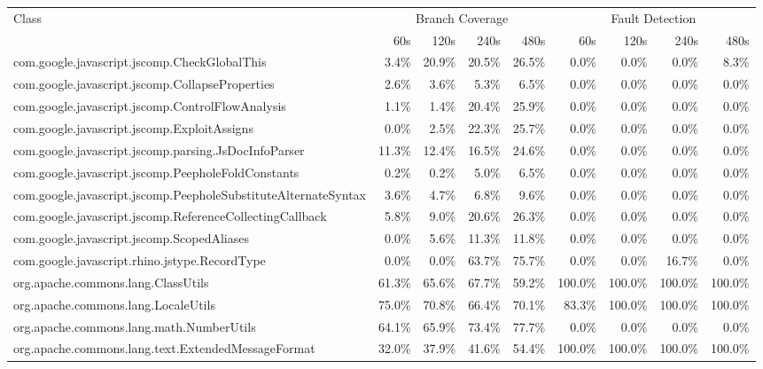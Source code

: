 \begin{tabular}{ l rrrr rrrr}\toprule 
 Class &  \multicolumn{4}{c}{Branch Coverage}  &  \multicolumn{4}{c}{Fault Detection} \\ 
 & 60s & 120s & 240s & 480s & 60s & 120s & 240s & 480s \\ 
\midrule 
com.google.javascript.jscomp.CheckGlobalThis &  3.4\% &  20.9\% &  20.5\% &  26.5\% &  0.0\% &  0.0\% &  0.0\% &  8.3\%\\ 
com.google.javascript.jscomp.CollapseProperties &  2.6\% &  3.6\% &  5.3\% &  6.5\% &  0.0\% &  0.0\% &  0.0\% &  0.0\%\\ 
com.google.javascript.jscomp.ControlFlowAnalysis &  1.1\% &  1.4\% &  20.4\% &  25.9\% &  0.0\% &  0.0\% &  0.0\% &  0.0\%\\ 
com.google.javascript.jscomp.ExploitAssigns &  0.0\% &  2.5\% &  22.3\% &  25.7\% &  0.0\% &  0.0\% &  0.0\% &  0.0\%\\ 
com.google.javascript.jscomp.parsing.JsDocInfoParser &  11.3\% &  12.4\% &  16.5\% &  24.6\% &  0.0\% &  0.0\% &  0.0\% &  0.0\%\\ 
com.google.javascript.jscomp.PeepholeFoldConstants &  0.2\% &  0.2\% &  5.0\% &  6.5\% &  0.0\% &  0.0\% &  0.0\% &  0.0\%\\ 
com.google.javascript.jscomp.PeepholeSubstituteAlternateSyntax &  3.6\% &  4.7\% &  6.8\% &  9.6\% &  0.0\% &  0.0\% &  0.0\% &  0.0\%\\ 
com.google.javascript.jscomp.ReferenceCollectingCallback &  5.8\% &  9.0\% &  20.6\% &  26.3\% &  0.0\% &  0.0\% &  0.0\% &  0.0\%\\ 
com.google.javascript.jscomp.ScopedAliases &  0.0\% &  5.6\% &  11.3\% &  11.8\% &  0.0\% &  0.0\% &  0.0\% &  0.0\%\\ 
com.google.javascript.rhino.jstype.RecordType &  0.0\% &  0.0\% &  63.7\% &  75.7\% &  0.0\% &  0.0\% &  16.7\% &  0.0\%\\ 
org.apache.commons.lang.ClassUtils &  61.3\% &  65.6\% &  67.7\% &  59.2\% &  100.0\% &  100.0\% &  100.0\% &  100.0\%\\ 
org.apache.commons.lang.LocaleUtils &  75.0\% &  70.8\% &  66.4\% &  70.1\% &  83.3\% &  100.0\% &  100.0\% &  100.0\%\\ 
org.apache.commons.lang.math.NumberUtils &  64.1\% &  65.9\% &  73.4\% &  77.7\% &  0.0\% &  0.0\% &  0.0\% &  0.0\%\\ 
org.apache.commons.lang.text.ExtendedMessageFormat &  32.0\% &  37.9\% &  41.6\% &  54.4\% &  100.0\% &  100.0\% &  100.0\% &  100.0\%\\ 

\end{tabular}
